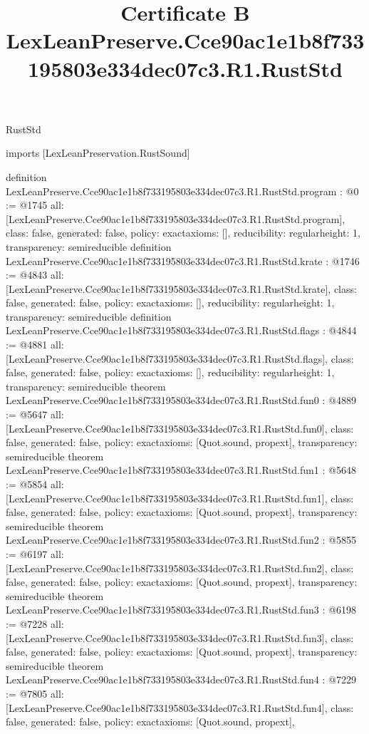\begin{lexlean}{RustStd}
\title{Certificate B LexLeanPreserve.Cce90ac1e1b8f733195803e334dec07c3.R1.RustStd}
\begin{coremodule}
imports [LexLeanPreservation.RustSound]

definition LexLeanPreserve.Cce90ac1e1b8f733195803e334dec07c3.R1.RustStd.program : @0 := @1745 {
  all: [LexLeanPreserve.Cce90ac1e1b8f733195803e334dec07c3.R1.RustStd.program],
  class: false,
  generated: false,
  policy: exact{axioms: []},
  reducibility: regular{height: 1},
  transparency: semireducible
}
definition LexLeanPreserve.Cce90ac1e1b8f733195803e334dec07c3.R1.RustStd.krate : @1746 := @4843 {
  all: [LexLeanPreserve.Cce90ac1e1b8f733195803e334dec07c3.R1.RustStd.krate],
  class: false,
  generated: false,
  policy: exact{axioms: []},
  reducibility: regular{height: 1},
  transparency: semireducible
}
definition LexLeanPreserve.Cce90ac1e1b8f733195803e334dec07c3.R1.RustStd.flags : @4844 := @4881 {
  all: [LexLeanPreserve.Cce90ac1e1b8f733195803e334dec07c3.R1.RustStd.flags],
  class: false,
  generated: false,
  policy: exact{axioms: []},
  reducibility: regular{height: 1},
  transparency: semireducible
}
theorem LexLeanPreserve.Cce90ac1e1b8f733195803e334dec07c3.R1.RustStd.fun0 : @4889 := @5647 {
  all: [LexLeanPreserve.Cce90ac1e1b8f733195803e334dec07c3.R1.RustStd.fun0],
  class: false,
  generated: false,
  policy: exact{axioms: [Quot.sound, propext]},
  transparency: semireducible
}
theorem LexLeanPreserve.Cce90ac1e1b8f733195803e334dec07c3.R1.RustStd.fun1 : @5648 := @5854 {
  all: [LexLeanPreserve.Cce90ac1e1b8f733195803e334dec07c3.R1.RustStd.fun1],
  class: false,
  generated: false,
  policy: exact{axioms: [Quot.sound, propext]},
  transparency: semireducible
}
theorem LexLeanPreserve.Cce90ac1e1b8f733195803e334dec07c3.R1.RustStd.fun2 : @5855 := @6197 {
  all: [LexLeanPreserve.Cce90ac1e1b8f733195803e334dec07c3.R1.RustStd.fun2],
  class: false,
  generated: false,
  policy: exact{axioms: [Quot.sound, propext]},
  transparency: semireducible
}
theorem LexLeanPreserve.Cce90ac1e1b8f733195803e334dec07c3.R1.RustStd.fun3 : @6198 := @7228 {
  all: [LexLeanPreserve.Cce90ac1e1b8f733195803e334dec07c3.R1.RustStd.fun3],
  class: false,
  generated: false,
  policy: exact{axioms: [Quot.sound, propext]},
  transparency: semireducible
}
theorem LexLeanPreserve.Cce90ac1e1b8f733195803e334dec07c3.R1.RustStd.fun4 : @7229 := @7805 {
  all: [LexLeanPreserve.Cce90ac1e1b8f733195803e334dec07c3.R1.RustStd.fun4],
  class: false,
  generated: false,
  policy: exact{axioms: [Quot.sound, propext]},
}
\end{coremodule}
\end{lexlean}
